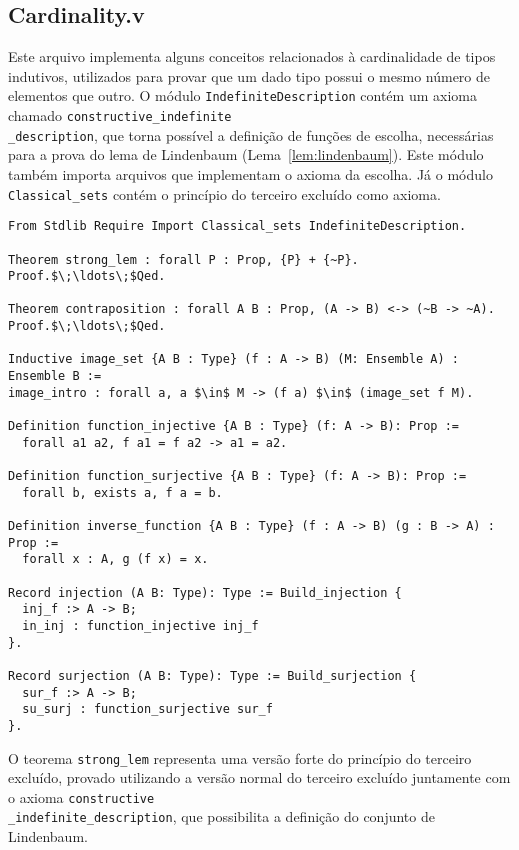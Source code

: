     \subsection{Cardinality.v}\label{sec:cardinality}

        Este arquivo implementa alguns conceitos relacionados à cardinalidade de tipos indutivos, utilizados para provar que um dado tipo possui o mesmo número de elementos que outro. O módulo \texttt{IndefiniteDescription} contém um axioma chamado \texttt{constructive\_indefinite\\\_description}, que torna possível a definição de funções de escolha, necessárias para a prova do lema de Lindenbaum (Lema~\ref{lem:lindenbaum}). Este módulo também importa arquivos que implementam o axioma da escolha. Já o módulo \texttt{Classical\_sets} contém o princípio do terceiro excluído como axioma.

        \begin{lstlisting}[name=LFI, frame=single, language=coq]
From Stdlib Require Import Classical_sets IndefiniteDescription.

Theorem strong_lem : forall P : Prop, {P} + {~P}.
Proof.$\;\ldots\;$Qed. 

Theorem contraposition : forall A B : Prop, (A -> B) <-> (~B -> ~A).
Proof.$\;\ldots\;$Qed.

Inductive image_set {A B : Type} (f : A -> B) (M: Ensemble A) : Ensemble B :=
image_intro : forall a, a $\in$ M -> (f a) $\in$ (image_set f M).

Definition function_injective {A B : Type} (f: A -> B): Prop :=
  forall a1 a2, f a1 = f a2 -> a1 = a2.

Definition function_surjective {A B : Type} (f: A -> B): Prop :=
  forall b, exists a, f a = b.
  
Definition inverse_function {A B : Type} (f : A -> B) (g : B -> A) : Prop :=
  forall x : A, g (f x) = x.

Record injection (A B: Type): Type := Build_injection {
  inj_f :> A -> B;
  in_inj : function_injective inj_f
}.

Record surjection (A B: Type): Type := Build_surjection {
  sur_f :> A -> B;
  su_surj : function_surjective sur_f
}.
          \end{lstlisting}

          O teorema \texttt{strong\_lem} representa uma versão forte do princípio do terceiro excluído, provado utilizando a versão normal do terceiro excluído juntamente com o axioma \texttt{constructive\\\_indefinite\_description}, que possibilita a definição do conjunto de Lindenbaum.
          
